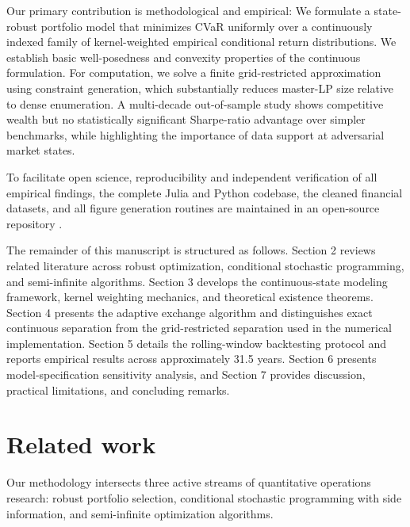 \documentclass[smallextended]{svjour3}
\begin{document}
Our primary contribution is methodological and empirical: We formulate a state-robust portfolio model that minimizes CVaR uniformly over a continuously indexed family of kernel-weighted empirical conditional return distributions. We establish basic well-posedness and convexity properties of the continuous formulation. For computation, we solve a finite grid-restricted approximation using constraint generation, which substantially reduces master-LP size relative to dense enumeration. A multi-decade out-of-sample study shows competitive wealth but no statistically significant Sharpe-ratio advantage over simpler benchmarks, while highlighting the importance of data support at adversarial market states.

To facilitate open science, reproducibility and independent verification of all empirical findings, the complete Julia and Python codebase, the cleaned financial datasets, and all figure generation routines are maintained in an open-source repository \cite{bezoui2026robust}.

The remainder of this manuscript is structured as follows. Section 2 reviews related literature across robust optimization, conditional stochastic programming, and semi-infinite algorithms. Section 3 develops the continuous-state modeling framework, kernel weighting mechanics, and theoretical existence theorems. Section 4 presents the adaptive exchange algorithm and distinguishes exact continuous separation from the grid-restricted separation used in the numerical implementation. Section 5 details the rolling-window backtesting protocol and reports empirical results across approximately 31.5 years. Section 6 presents model-specification sensitivity analysis, and Section 7 provides discussion, practical limitations, and concluding remarks.

\section{Related work}
Our methodology intersects three active streams of quantitative operations research: robust portfolio selection, conditional stochastic programming with side information, and semi-infinite optimization algorithms.
\end{document}
